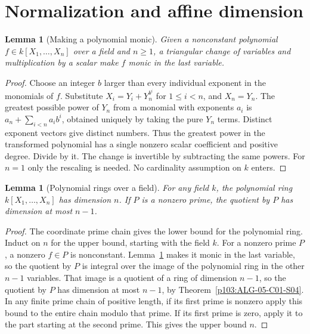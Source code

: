 \documentclass[11pt,oneside,openany]{book}
\newtheorem{lemma}[theorem]{Lemma}
\theoremstyle{definition}
\theoremstyle{remark}
\begin{document}
\section{Normalization and affine dimension}

\begin{lemma}[Making a polynomial monic]\label{p103:normalization-coordinate}
Given a nonconstant polynomial \(f\in k[X_1,\ldots,X_n]\) over a field and \(n\ge1\), a triangular change of variables and multiplication by a scalar make \(f\) monic in the last variable.
\end{lemma}
\begin{proof}
Choose an integer \(b\) larger than every individual exponent in the monomials of \(f\). Substitute \(X_i=Y_i+Y_n^{b^i}\) for \(1\le i<n\), and \(X_n=Y_n\). The greatest possible power of \(Y_n\) from a monomial with exponents \(a_i\) is \(a_n+\sum_{i<n}a_ib^i\), obtained uniquely by taking the pure \(Y_n\) terms. Distinct exponent vectors give distinct numbers. Thus the greatest power in the transformed polynomial has a single nonzero scalar coefficient and positive degree. Divide by it. The change is invertible by subtracting the same powers. For \(n=1\) only the rescaling is needed. No cardinality assumption on \(k\) enters.
\end{proof}

\begin{lemma}[Polynomial rings over a field]\label{p103:polynomial-dimension}
For any field \(k\), the polynomial ring \(k[X_1,\ldots,X_n]\) has dimension \(n\). If \(P\) is a nonzero prime, the quotient by \(P\) has dimension at most \(n-1\).
\end{lemma}
\begin{proof}
The coordinate prime chain gives the lower bound for the polynomial ring. Induct on \(n\) for the upper bound, starting with the field \(k\). For a nonzero prime \(P\), a nonzero \(f\in P\) is nonconstant. Lemma~\ref{p103:normalization-coordinate} makes it monic in the last variable, so the quotient by \(P\) is integral over the image of the polynomial ring in the other \(n-1\) variables. That image is a quotient of a ring of dimension \(n-1\), so the quotient by \(P\) has dimension at most \(n-1\), by Theorem~\ref{p103:ALG-05-C01-S04}. In any finite prime chain of positive length, if its first prime is nonzero apply this bound to the entire chain modulo that prime. If its first prime is zero, apply it to the part starting at the second prime. This gives the upper bound \(n\).
\end{proof}
\end{document}
